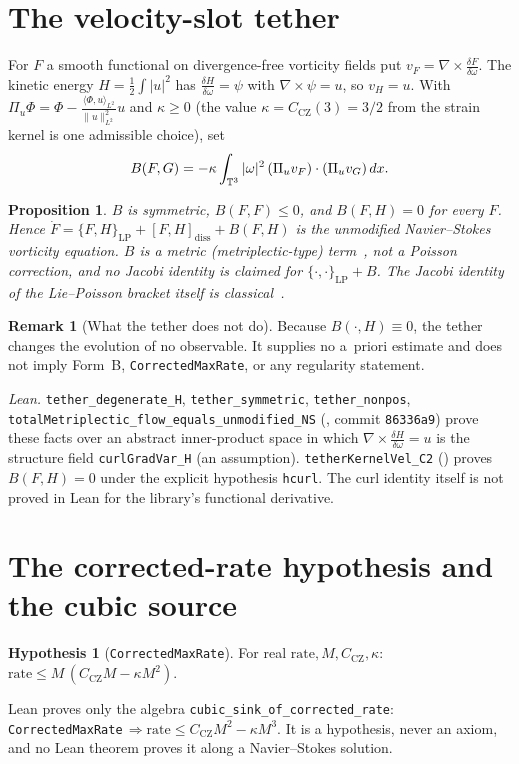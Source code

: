 \documentclass[11pt,reqno]{amsart}
\newtheorem{proposition}[theorem]{Proposition}
\theoremstyle{definition}
\newtheorem{hypothesis}[theorem]{Hypothesis}
\newtheorem{remark}[theorem]{Remark}
\newcommand{\lean}[1]{\texttt{#1}}
\newcommand{\norm}[1]{\lVert #1\rVert}
\begin{document}
\section{The velocity-slot tether}
For $F$ a smooth functional on divergence-free vorticity fields put $v_F=\nabla\times\frac{\delta F}{\delta\omega}$. The kinetic energy $H=\frac12\int|u|^2$ has $\frac{\delta H}{\delta\omega}=\psi$ with $\nabla\times\psi=u$, so $v_H=u$. With $\Pi_u\Phi=\Phi-\frac{\langle\Phi,u\rangle_{L^2}}{\norm{u}_{L^2}^2}u$ and $\kappa\ge0$ (the value $\kappa=C_{\mathrm{CZ}}(3)=3/2$ from the strain kernel is one admissible choice), set
\[
B(F,G)=-\kappa\int_{\mathbb{T}^3}|\omega|^2\,(\Pi_uv_F)\cdot(\Pi_uv_G)\,dx .
\]
\begin{proposition}\label{prop:tether}
$B$ is symmetric, $B(F,F)\le0$, and $B(F,H)=0$ for every $F$. Hence $\dot F=\{F,H\}_{\mathrm{LP}}+[F,H]_{\mathrm{diss}}+B(F,H)$ is the unmodified Navier--Stokes vorticity equation. $B$ is a metric (metriplectic-type) term~\cite{Morrison1986}, not a Poisson correction, and no Jacobi identity is claimed for $\{\cdot,\cdot\}_{\mathrm{LP}}+B$. The Jacobi identity of the Lie--Poisson bracket itself is classical~\cite{Arnold1966,MW1983,AK1998}.
\end{proposition}
\begin{remark}[What the tether does not do]
Because $B(\cdot,H)\equiv0$, the tether changes the evolution of no observable. It supplies no a~priori estimate and does not imply Form~B, \lean{CorrectedMaxRate}, or any regularity statement.
\end{remark}
\noindent\emph{Lean.} \lean{tether\_degenerate\_H}, \lean{tether\_symmetric}, \lean{tether\_nonpos}, \lean{totalMetriplectic\_flow\_equals\_unmodified\_NS} (, commit \texttt{86336a9}) prove these facts over an abstract inner-product space in which $\nabla\times\frac{\delta H}{\delta\omega}=u$ is the structure field \lean{curlGradVar\_H} (an assumption). \lean{tetherKernelVel\_C2} () proves $B(F,H)=0$ under the explicit hypothesis \lean{hcurl}. The curl identity itself is not proved in Lean for the library's functional derivative.

\section{The corrected-rate hypothesis and the cubic source}\label{sec:rate}
\begin{hypothesis}[\lean{CorrectedMaxRate}]\label{hyp:cmr}
For real $\mathrm{rate},M,C_{\mathrm{CZ}},\kappa$: $\mathrm{rate}\le M\,(C_{\mathrm{CZ}}M-\kappa M^2)$.
\end{hypothesis}
Lean proves only the algebra \lean{cubic\_sink\_of\_corrected\_rate}: \lean{CorrectedMaxRate}$\,\Rightarrow\mathrm{rate}\le C_{\mathrm{CZ}}M^2-\kappa M^3$. It is a hypothesis, never an axiom, and no Lean theorem proves it along a Navier--Stokes solution.
\end{document}
